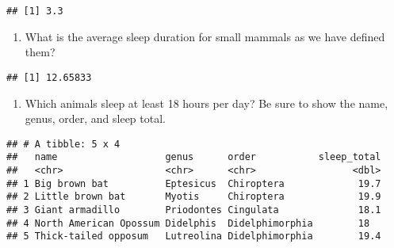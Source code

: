 \documentclass[]{article}
\newenvironment{Shaded}{\begin{snugshade}}{\end{snugshade}}
\newcommand{\KeywordTok}[1]{\textcolor[rgb]{0.13,0.29,0.53}{\textbf{#1}}}
\newcommand{\DecValTok}[1]{\textcolor[rgb]{0.00,0.00,0.81}{#1}}
\newcommand{\StringTok}[1]{\textcolor[rgb]{0.31,0.60,0.02}{#1}}
\newcommand{\OperatorTok}[1]{\textcolor[rgb]{0.81,0.36,0.00}{\textbf{#1}}}
\newcommand{\NormalTok}[1]{#1}
\providecommand{\tightlist}{%
  \setlength{\itemsep}{0pt}\setlength{\parskip}{0pt}}
\begin{document}
\begin{Shaded}
\end{Shaded}

\begin{verbatim}
## [1] 3.3
\end{verbatim}

\begin{enumerate}
\def\labelenumi{\arabic{enumi}.}
\setcounter{enumi}{5}
\tightlist
\item
  What is the average sleep duration for small mammals as we have
  defined them?
\end{enumerate}

\begin{Shaded}
\end{Shaded}

\begin{verbatim}
## [1] 12.65833
\end{verbatim}

\begin{enumerate}
\def\labelenumi{\arabic{enumi}.}
\setcounter{enumi}{6}
\tightlist
\item
  Which animals sleep at least 18 hours per day? Be sure to show the
  name, genus, order, and sleep total.
\end{enumerate}

\begin{Shaded}
\end{Shaded}

\begin{verbatim}
## # A tibble: 5 x 4
##   name                   genus      order           sleep_total
##   <chr>                  <chr>      <chr>                 <dbl>
## 1 Big brown bat          Eptesicus  Chiroptera             19.7
## 2 Little brown bat       Myotis     Chiroptera             19.9
## 3 Giant armadillo        Priodontes Cingulata              18.1
## 4 North American Opossum Didelphis  Didelphimorphia        18  
## 5 Thick-tailed opposum   Lutreolina Didelphimorphia        19.4
\end{verbatim}
\end{document}
